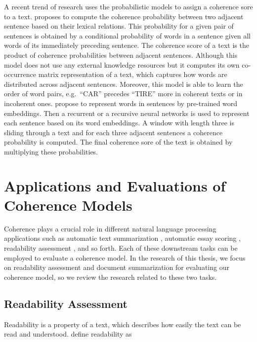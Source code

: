 A recent trend of research uses the probabilistic models to assign a coherence sore to a text. 
 proposes to compute the coherence probability between two adjacent sentence based on their lexical relations. 
This probability for a given pair of sentences is obtained by a conditional probability of words in a sentence given all words of its immediately preceding sentence. 
The coherence score of a text is the product of coherence probabilities between adjacent sentences. 
Although this model does not use any external knowledge resources but it computes its own co-occurrence matrix representation of a  text, which captures how words are distributed across adjacent sentences. 
Moreover, this model is able to learn the order of word pairs, e.g.\ ``CAR'' precedes ``TIRE'' more in coherent texts or in incoherent ones.  
 propose to represent words in sentences by pre-trained word embeddings. 
Then a recurrent or a recursive neural networks is used to represent each sentence based on its word embeddings. 
A window with length three is sliding through a text and for each three adjacent sentences a coherence probability is computed. 
The final coherence sore of the text is obtained by multiplying these probabilities. 

\section{Applications and Evaluations of Coherence Models}
\label{sec:rel-coh-applications}

Coherence plays a crucial role in different natural language processing applications such as automatic text summarization \cite{celikyilmaz11,linzhiheng12,fengvanessawei12a}, automatic essay scoring \cite{miltsakaki04a,higgins04,burstein10}, readability assessment \cite{pitler08,wangxinhao13}, and so forth.  
Each of these downstream tasks can be employed to evaluate a coherence model. 
In the research of this thesis, we focus on readability assessment and document summarization for evaluating our coherence model, so we review the research related to these two tasks. 

\subsection{Readability Assessment}

Readability is a property of a text, which describes how easily the text can be read and understood.  
 define readability as 

